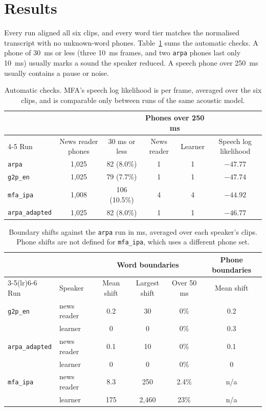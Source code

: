 \documentclass[11pt,a4paper]{article}
\newcommand{\code}[1]{\texttt{#1}}
\begin{document}
\section{Results}

Every run aligned all six clips, and every word tier matches the normalised transcript with no unknown-word phones.
Table~\ref{tab:checks} sums the automatic checks. A phone of 30~ms or less (three 10~ms frames, and two \code{arpa} phones
last only 10~ms) usually marks a sound the speaker reduced. A speech phone over 250~ms usually contains a pause or noise.

\begin{table}[htbp]
\centering\small
\caption{Automatic checks. MFA's speech log likelihood is per frame, averaged over the six clips, and is comparable only
between runs of the same acoustic model.}
\label{tab:checks}
\begin{tabular}{lccccc}
\toprule
& & & \multicolumn{2}{c}{Phones over 250 ms} & \\
\cmidrule(lr){4-5}
Run & News reader phones & 30 ms or less & News reader & Learner & Speech log likelihood \\
\midrule
\code{arpa} & 1{,}025 & 82 (8.0\%) & 1 & 1 & $-47.77$ \\
\code{g2p\_en} & 1{,}025 & 79 (7.7\%) & 1 & 1 & $-47.74$ \\
\code{mfa\_ipa} & 1{,}008 & 106 (10.5\%) & 4 & 4 & $-44.92$ \\
\code{arpa\_adapted} & 1{,}025 & 82 (8.0\%) & 1 & 1 & $-46.77$ \\
\bottomrule
\end{tabular}
\end{table}

\begin{table}[htbp]
\centering\small
\caption{Boundary shifts against the \code{arpa} run in ms, averaged over each speaker's clips. Phone shifts are not
defined for \code{mfa\_ipa}, which uses a different phone set.}
\label{tab:diff}
\begin{tabular}{llcccc}
\toprule
& & \multicolumn{3}{c}{Word boundaries} & Phone boundaries \\
\cmidrule(lr){3-5}\cmidrule(lr){6-6}
Run & Speaker & Mean shift & Largest shift & Over 50 ms & Mean shift \\
\midrule
\code{g2p\_en} & news reader & 0.2 & 30 & 0\% & 0.2 \\
 & learner & 0 & 0 & 0\% & 0.3 \\
\code{arpa\_adapted} & news reader & 0.1 & 10 & 0\% & 0.1 \\
 & learner & 0 & 0 & 0\% & 0 \\
\code{mfa\_ipa} & news reader & 8.3 & 250 & 2.4\% & n/a \\
 & learner & 175 & 2{,}460 & 23\% & n/a \\
\bottomrule
\end{tabular}
\end{table}
\end{document}

